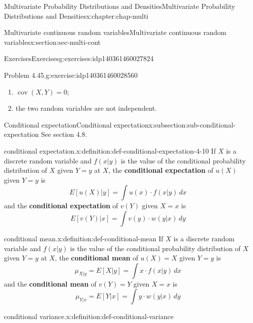 \documentclass[oneside,10pt,]{book}
\newcommand{\terminology}[1]{\textbf{#1}}
\numberwithin{equation}{section}
\begin{document}
\begin{chapterptx}{Multivariate Probability Distributions and Densities}{}{Multivariate Probability Distributions and Densities}{}{}{x:chapter:chap-multi}
\begin{sectionptx}{Multivariate continuous random variables}{}{Multivariate continuous random variables}{}{}{x:section:sec-multi-cont}
\begin{exercises-subsection}{Exercises}{}{Exercises}{}{}{g:exercises:idp140361460027824}
\begin{divisionexercise}{2}{Problem 4.45.}{}{g:exercise:idp140361460028560}
\begin{enumerate}[label=(\alph*)]
\item{}\(\operatorname{cov}(X, Y) = 0\);%
\item{}the two random variables are not independent.%
\end{enumerate}
%
\end{divisionexercise}%
\end{exercises-subsection}
%
%
\typeout{************************************************}
\typeout{************************************************}
%
\begin{subsectionptx}{Conditional expectation}{}{Conditional expectation}{}{}{x:subsection:sub-conditional-expectation}
See section 4.8.%
\begin{definition}{conditional expectation.}{x:definition:def-conditional-expectation-4-10}%
If \(X\) is a discrete random variable and \(\displaystyle f(x|y)\) is the value of the conditional probability distribution of \(X\) given \(\displaystyle Y = y\) at \(X\), the \terminology{conditional expectation} of \(\displaystyle u(X)\) given \(\displaystyle Y = y\) is%
\begin{equation*}
E[u(X)|y] = \int u(x)\cdot f(x|y)\,dx
\end{equation*}
and the \terminology{conditional expectation} of \(\displaystyle v(Y)\) given \(\displaystyle X
= x\) is%
\begin{equation*}
E[v(Y)|x] = \int v(y)\cdot w(y|x)\,dy
\end{equation*}
%
\end{definition}
\begin{definition}{conditional mean.}{x:definition:def-conditional-mean}%
If \(X\) is a discrete random variable and \(\displaystyle f(x|y)\) is the value of the conditional probability distribution of \(X\) given \(\displaystyle Y = y\) at \(X\), the \terminology{conditional mean} of \(\displaystyle u(X) = X\) given \(\displaystyle Y = y\) is%
\begin{equation*}
\mu_{X|y} = E[X|y] = \int x\cdot f(x|y)\,dx
\end{equation*}
and the \terminology{conditional mean} of \(\displaystyle v(Y) = Y\) given \(\displaystyle X = x\) is%
\begin{equation*}
\displaystyle \mu_{Y|x} = E[Y|x] = \int y\cdot w(y|x)\,dy
\end{equation*}
%
\end{definition}
\begin{definition}{conditional variance.}{x:definition:def-conditional-variance}%

\end{definition}
\end{subsectionptx}
\end{sectionptx}
\end{chapterptx}
\end{document}
